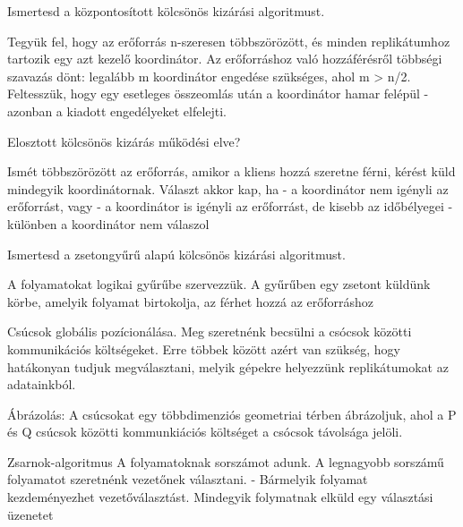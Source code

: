 \documentclass[12pt]{article}
\begin{document}
\begin{description}
                                    \item  Ismertesd a központosított kölcsönös kizárási algoritmust.
                                    \item Tegyük fel, hogy az erőforrás n-szeresen többszörözött, és minden replikátumhoz tartozik egy azt kezelő koordinátor.
                                        Az erőforráshoz való hozzáférésről többségi szavazás dönt: legalább m koordinátor engedése szükséges, ahol m > n/2.
                                        Feltesszük, hogy egy esetleges összeomlás után a koordinátor hamar felépül - azonban a kiadott engedélyeket elfelejti.
                                    \item  Elosztott kölcsönös kizárás működési elve?
                                    \item Ismét többszörözött az erőforrás, amikor a kliens hozzá szeretne férni, kérést küld mindegyik koordinátornak. Választ akkor kap, ha
                                        - a koordinátor nem igényli az erőforrást, vagy
                                        - a koordinátor is igényli az erőforrást, de kisebb az időbélyegei
                                        - különben a koordinátor nem válaszol
                                    \item  Ismertesd a zsetongyűrű alapú kölcsönös kizárási algoritmust.
                                    \item A folyamatokat logikai gyűrűbe szervezzük. A gyűrűben egy zsetont küldünk körbe, amelyik folyamat birtokolja,
                                        az férhet hozzá az erőforráshoz
                                    \item  Csúcsok globális pozícionálása. Meg szeretnénk becsülni a csócsok közötti kommunikációs költségeket. Erre többek között azért van szükség, hogy hatákonyan
                                        tudjuk megválasztani, melyik gépekre helyezzünk replikátumokat az adatainkból.
                                    \item Ábrázolás: A csúcsokat egy többdimenziós geometriai térben ábrázoljuk, ahol a P és Q csúcsok közötti kommunkiációs költséget a csócsok távolsága jelöli.
                                    \item  Zsarnok-algoritmus
                                        A folyamatoknak sorszámot adunk. A legnagyobb sorszámű folyamatot szeretnénk vezetőnek választani.
                                        - Bármelyik folyamat kezdeményezhet vezetőválasztást. Mindegyik folymatnak elküld egy választási üzenetet

\end{description}
\end{document}
